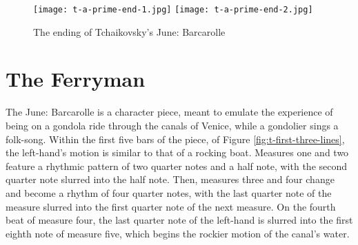 \begin{figure}
  \centering
  \texttt{[image: t-a-prime-end-1.jpg]}
  \texttt{[image: t-a-prime-end-2.jpg]}
  \caption{The ending of Tchaikovsky's June: Barcarolle}
  \label{fig:t-a-prime-ending}
\end{figure}

\section{The Ferryman}

The June: Barcarolle is a character piece, meant to emulate the experience of being on a gondola ride through the canals of Venice, while a gondolier sings a folk-song. Within the first five bars of the piece, of Figure \ref{fig:t-first-three-lines}\autocite{Henle_2002}, the left-hand's motion is similar to that of a rocking boat. Measures one and two feature a rhythmic pattern of two quarter notes and a half note, with the second quarter note slurred into the half note. Then, measures three and four change and become a rhythm of four quarter notes, with the last quarter note of the measure slurred into the first quarter note of the next measure. On the fourth beat of measure four, the last quarter note of the left-hand is slurred into the first eighth note of measure five, which begins the rockier motion of the canal's water.

